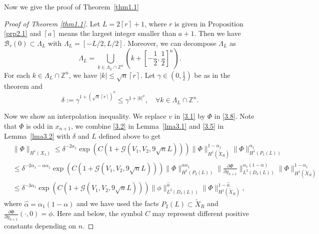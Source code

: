 \documentclass{article}
\numberwithin{equation}{section}
\newcommand\Z{\ensuremath{\mathbb{Z}}}
\numberwithin{equation}{section}
\theoremstyle{definition}
\begin{document}
Now we give the proof of Theorem~\ref{thm1.1}
\begin{proof}[Proof of Theorem \ref{thm1.1}]
	Let $L=2\left\lceil r \right\rceil +1$, where $r$ is given in Proposition \ref{prp2.1} and $\left\lceil a \right\rceil $ means the largest integer smaller than $a+1$.  Then we have $\mathcal{B}_r(0)\subset \Lambda_L$ with $\Lambda_L=\left[ -L /2,L /2 \right] $. Moreover, we can decompose  $\Lambda_L$ as
	\begin{equation}
		\Lambda_L= \bigcup_{k\in \Lambda_L \cap \Z^{n}} \left( k+\left[ -\frac{1}{2},\frac{1}{2} \right]^{n}  \right). 
	\end{equation}
	For each $k \in \Lambda_L\cap \Z^{n}$, we have $|k|\le \sqrt{n} \left\lceil r \right\rceil $. Let $\gamma\in (0,\frac{1}{2})$ be as in the theorem and
	\begin{equation}
		\delta:= \gamma ^{1+ \left( \sqrt{n} \left\lceil r \right\rceil  \right) ^{\sigma } }\le \gamma^{1+|k|^{\sigma }}, \quad  \forall k \in \Lambda_L \cap \Z^{n}.
	\end{equation}

	Now we show an interpolation inequality. We replace $v$ in \eqref{3.1} by $\Phi$ in \eqref{3.8}. Note that $\Phi$ is odd in $x_{n+1}$, we combine \eqref{3.2} in Lemma~\ref{lma3.1} and \eqref{3.5} in Lemma~\ref{lma3.2} with $\delta$ and $L$ defined above to get
	\begin{equation}
		\begin{aligned}
			&\|\Phi\|_{H^{1}(X_1)}\le \delta^{-2 \alpha_1}\exp\left( C\left( 1+\mathcal{G}\left( V_1,V_2,9 \sqrt{n} L \right)  \right)  \right) \|\Phi\|^{1-\alpha_1}_{H^{1}(\widetilde{X}_{R})}\|\Phi\|^{\alpha_1}_{H^{1}\left( P_1(L) \right) }\\
					     &\le \delta ^{-2 \alpha_1-\alpha \alpha_1}\exp\left( C\left( 1+\mathcal{G}\left( V_1,V_2,9 \sqrt{n} L \right)  \right)  \right) \|\Phi\|^{\alpha \alpha_1}_{H^{1}(P_2(L))}\|\frac{\partial \Phi}{\partial y_{n+1}}\|^{\alpha_1  (1-\alpha )}_{L^2(D_\delta(L))}\|\Phi\|^{1-\alpha_1}_{H^{1}(\widetilde{X}_{R})}\\
					     & \le \delta^{-3 \alpha_1}\exp \left( C\left( 1+\mathcal{G}\left( V_1,V_2,9 \sqrt{n} L \right)  \right)  \right) \|\phi\|^{\hat{\alpha}}_{L^2(D_\delta(L))}\|\Phi\|^{1-\hat{\alpha}}_{H^{1}\left( \widetilde{X}_{R} \right) },
		\end{aligned} 
	\end{equation}
	where $\hat{\alpha}=\alpha_1 (1-\alpha )$ and we have used the facts $P_2(L) \subset \widetilde{X}_{R}$ and $\frac{\partial \Phi}{\partial y_{n+1}}(\cdot ,0)=\phi$. Here and below, the symbol $C$ may represent different positive constants depending on $n$.


\end{proof}
\end{document}
